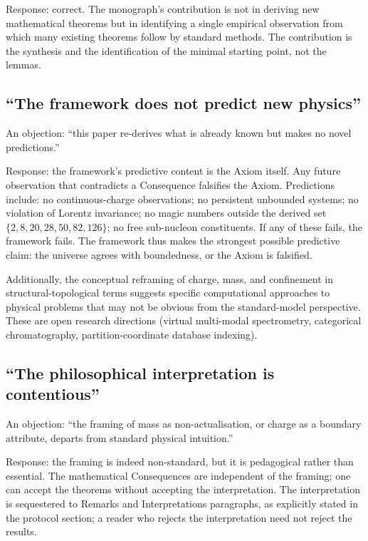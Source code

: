 Response: correct.  The monograph's contribution is not in deriving new
mathematical theorems but in identifying a single empirical observation
from which many existing theorems follow by standard methods.  The
contribution is the synthesis and the identification of the minimal starting
point, not the lemmas.

\subsection*{``The framework does not predict new physics''}

An objection: ``this paper re-derives what is already known but makes no
novel predictions.''

Response: the framework's predictive content is the Axiom itself.  Any
future observation that contradicts a Consequence falsifies the Axiom.
Predictions include: no continuous-charge observations; no persistent
unbounded systems; no violation of Lorentz invariance; no magic numbers
outside the derived set $\{2,8,20,28,50,82,126\}$; no free sub-nucleon
constituents.  If any of these fails, the framework fails.  The framework
thus makes the strongest possible predictive claim: the universe agrees with
boundedness, or the Axiom is falsified.

Additionally, the conceptual reframing of charge, mass, and confinement in
structural-topological terms suggests specific computational approaches to
physical problems that may not be obvious from the standard-model
perspective.  These are open research directions (virtual multi-modal
spectrometry, categorical chromatography, partition-coordinate database
indexing).

\subsection*{``The philosophical interpretation is contentious''}

An objection: ``the framing of mass as non-actualisation, or charge as a
boundary attribute, departs from standard physical intuition.''

Response: the framing is indeed non-standard, but it is pedagogical rather
than essential.  The mathematical Consequences are independent of the
framing; one can accept the theorems without accepting the interpretation.
The interpretation is sequestered to Remarks and Interpretations paragraphs,
as explicitly stated in the protocol section; a reader who rejects the
interpretation need not reject the results.

